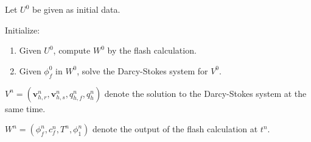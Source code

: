 \documentclass[usenames,dvipsnames,letterpaper,landscape,final]{slides}
\def\v{\mathbf{v}}
\begin{document}
\begin{myslideNoFooter}

\begin{algorithm}[H]
\caption{Sequential solution\label{alg:sequential}}
\SetAlgoLined
 Let $U^0$ be given as initial data.
 
 Initialize:
 \begin{enumerate}
     \item Given $U^0$, compute $W^0$ by the flash calculation.
     \item Given $\phi_f^0$ in $W^0$, solve the Darcy-Stokes system for $V^{0}$.
\end{enumerate}
 
 \end{algorithm}

\begin{blist}
\item $V^n=(\v_{h,r}^n,\v_{h,s}^n,q_{h,f}^n,q_h^n)$ denote the solution to the Darcy-Stokes system at the same time.
\item $W^n=(\phi_f^n,c_f^n,T^n,\phi_1^n)$ denote the output of the flash calculation at $t^n$.
\end{blist}

\end{myslideNoFooter}
\end{document}

